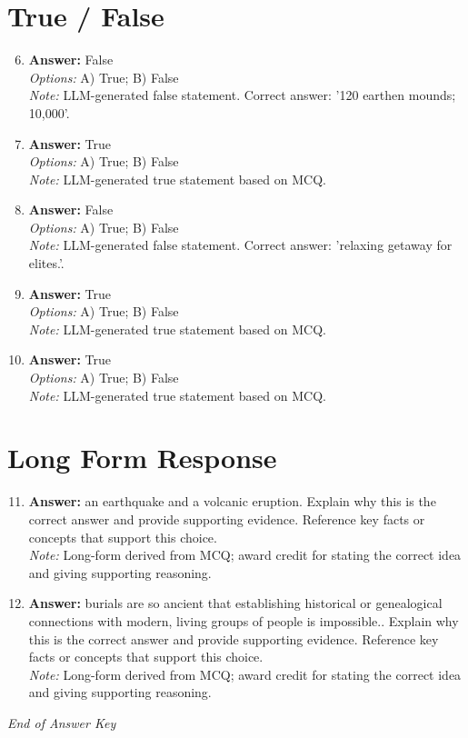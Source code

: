 \documentclass[12pt]{article}
\begin{document}
\section*{True / False}
\begin{enumerate}[label=\arabic*.]
\setcounter{enumi}{5}
\item \textbf{Answer:} False
\\ \textit{Options:} A) True; B) False
\\ \textit{Note:} LLM-generated false statement. Correct answer: '120 earthen mounds; 10,000'.
\item \textbf{Answer:} True
\\ \textit{Options:} A) True; B) False
\\ \textit{Note:} LLM-generated true statement based on MCQ.
\item \textbf{Answer:} False
\\ \textit{Options:} A) True; B) False
\\ \textit{Note:} LLM-generated false statement. Correct answer: 'relaxing getaway for elites.'.
\item \textbf{Answer:} True
\\ \textit{Options:} A) True; B) False
\\ \textit{Note:} LLM-generated true statement based on MCQ.
\item \textbf{Answer:} True
\\ \textit{Options:} A) True; B) False
\\ \textit{Note:} LLM-generated true statement based on MCQ.
\end{enumerate}

\section*{Long Form Response}
\begin{enumerate}[label=\arabic*.]
\setcounter{enumi}{10}
\item \textbf{Answer:} an earthquake and a volcanic eruption. Explain why this is the correct answer and provide
supporting evidence. Reference key facts or concepts that support this choice.
\\ \textit{Note:} Long-form derived from MCQ; award credit for stating the correct idea and giving supporting reasoning.
\item \textbf{Answer:} burials are so ancient that establishing historical or genealogical connections with
modern, living groups of people is impossible.. Explain why this is the correct answer and
provide supporting evidence. Reference key facts or concepts that support this choice.
\\ \textit{Note:} Long-form derived from MCQ; award credit for stating the correct idea and giving supporting reasoning.
\end{enumerate}

\vfill
\noindent\textit{End of Answer Key}
\end{document}

